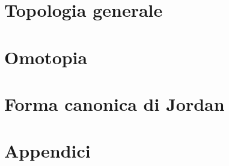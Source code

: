 \documentclass[a4paper, 11pt, twoside, openright, italian]{memoir}
\begin{document}
\frontmatter

%


\mainmatter

\part{Topologia generale}






\part{Omotopia}


%
%
\part{Forma canonica di Jordan}

%
%
%
%
%
%
%
\part{Appendici}

%
%
%
%
\backmatter

\end{document}
